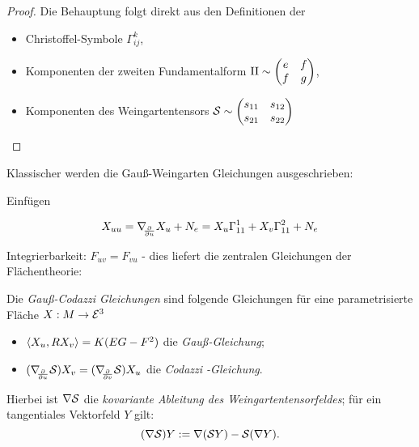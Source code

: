 \begin{proof}
	
	Die Behauptung folgt direkt aus den Definitionen der 
	\begin{itemize}
		
		\item Christoffel-Symbole $ \Gamma_{ij}^k $,
		\item Komponenten der zweiten Fundamentalform $ \mathrm{II} \sim \begin{pmatrix} e & f \\ f & g \end{pmatrix} $,
		\item  Komponenten des Weingartentensors $ \mathcal S  \sim \begin{pmatrix}  s_{11} & s_{12} \\ s_{21} & s_{22} \end{pmatrix}$
		
	\end{itemize}
	
\end{proof}
\begin{remark}
	
	Klassischer werden die Gauß-Weingarten Gleichungen ausgeschrieben:
	
		{\color{ForestGreen} Einfügen}
	
	\[ X_{uu} = \nabla_{\!\!{\partial\over \partial u}}X_u + N_e = X_u\Gamma_{11}^1 + X_v\Gamma_{11}^2 + N_e \]
		
\end{remark}
	
	Integrierbarkeit: 
		$ F_{uv}= F_{vu} $ - dies liefert die zentralen Gleichungen der Flächentheorie:

\begin{definition}
	
	Die \emph{Gauß-Codazzi Gleichungen} sind folgende Gleichungen für eine parametrisierte Fläche $ X: M \rightarrow \mathcal E^3 $
	
	\begin{itemize}
		
		\item $\left \langle X_u,RX_v \right\rangle=K(EG-F^2)$ die \emph{Gauß-Gleichung};
		\item $ (\nabla_{\!\!{\partial\over \partial u}} \mathcal S)X_v = (\nabla_{\!\!{\partial\over \partial v}} \mathcal S)X_u $ die \emph{Codazzi -Gleichung}.
		
	\end{itemize}
	Hierbei ist $ \nabla \mathcal S $ die \emph{kovariante Ableitung des Weingartentensorfeldes};
	für ein tangentiales Vektorfeld $ Y $ gilt:
		\[ (\nabla \mathcal S)Y := \nabla(\mathcal S Y) -\mathcal S(\nabla Y). \]
	
\end{definition}


